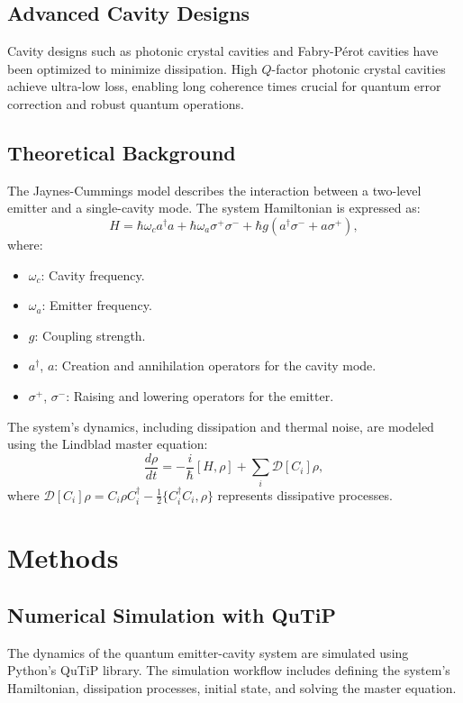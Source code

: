 \documentclass[conference]{IEEEtran}
\begin{document}
\subsection{Advanced Cavity Designs}
Cavity designs such as photonic crystal cavities and Fabry-Pérot cavities have been optimized to minimize dissipation. High $Q$-factor photonic crystal cavities achieve ultra-low loss, enabling long coherence times crucial for quantum error correction and robust quantum operations.

\subsection{Theoretical Background}
The Jaynes-Cummings model describes the interaction between a two-level emitter and a single-cavity mode. The system Hamiltonian is expressed as:
\begin{equation}
H = \hbar \omega_c a^\dagger a + \hbar \omega_a \sigma^+ \sigma^- + \hbar g \left(a^\dagger \sigma^- + a \sigma^+\right),
\end{equation}
where:
\begin{itemize}
    \item $\omega_c$: Cavity frequency.
    \item $\omega_a$: Emitter frequency.
    \item $g$: Coupling strength.
    \item $a^\dagger$, $a$: Creation and annihilation operators for the cavity mode.
    \item $\sigma^+$, $\sigma^-$: Raising and lowering operators for the emitter.
\end{itemize}

The system's dynamics, including dissipation and thermal noise, are modeled using the Lindblad master equation:
\begin{equation}
\frac{d\rho}{dt} = -\frac{i}{\hbar}[H, \rho] + \sum_i \mathcal{D}[C_i]\rho,
\end{equation}
where $\mathcal{D}[C_i]\rho = C_i \rho C_i^\dagger - \frac{1}{2}\{C_i^\dagger C_i, \rho\}$ represents dissipative processes.

\section{Methods}

\subsection{Numerical Simulation with QuTiP}
The dynamics of the quantum emitter-cavity system are simulated using Python’s QuTiP library. The simulation workflow includes defining the system’s Hamiltonian, dissipation processes, initial state, and solving the master equation.
\end{document}
